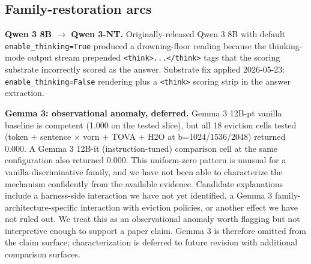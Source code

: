 \documentclass[10pt]{article}
\begin{document}
\subsection{Family-restoration arcs}\label{c-2-family-restoration-arcs}

\textbf{Qwen 3 8B $\rightarrow$ Qwen 3-NT.} Originally-released Qwen 3 8B with
default \texttt{enable\_thinking=True} produced a drowning-floor reading
because the thinking-mode output stream prepended
\texttt{\textless{}think\textgreater{}...\textless{}/think\textgreater{}}
tags that the scoring substrate incorrectly scored as the answer.
Substrate fix applied 2026-05-23: \texttt{enable\_thinking=False}
rendering plus a \texttt{\textless{}think\textgreater{}} scoring strip
in the answer extraction.

\textbf{Gemma 3: observational anomaly, deferred.} Gemma 3 12B-pt
vanilla baseline is competent (1.000 on the tested slice), but all
18 eviction cells tested (token + sentence $\times$ vorn + TOVA + H2O
at b=1024/1536/2048) returned 0.000. A Gemma 3 12B-it
(instruction-tuned) comparison cell at the same configuration also
returned 0.000. This uniform-zero pattern is unusual for a
vanilla-discriminative family, and we have not been able to
characterize the mechanism confidently from the available evidence.
Candidate explanations include a harness-side interaction we have not
yet identified, a Gemma 3 family-architecture-specific interaction
with eviction policies, or another effect we have not ruled out. We
treat this as an observational anomaly worth flagging but not
interpretive enough to support a paper claim. Gemma 3 is therefore
omitted from the claim surface; characterization is deferred to
future revision with additional comparison surfaces.
\end{document}
